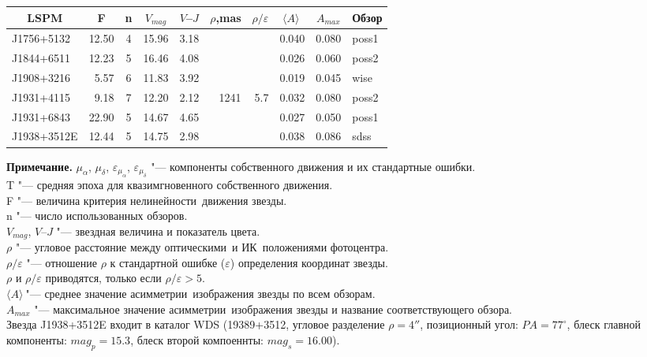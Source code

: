 \begin{table}[htbp]
\begin{tabularx}{\textwidth}{l|r|c|r|r|r|r|r|r|l}
\multicolumn{1}{c|}{LSPM}&\multicolumn{1}{c|}{F}&\multicolumn{1}{c|}{n}&\multicolumn{1}{c|}{$V_{mag}$}&\multicolumn{1}{c|}{{\small$V$--$J$}}&\multicolumn{1}{c|}{$\rho$,mas}&\multicolumn{1}{c|}{$\rho/\varepsilon$}&\multicolumn{1}{c|}{$\langle A\rangle\ $}&\multicolumn{1}{c|}{$A_{max}$}& \multicolumn{1}{c}{Обзор}\\ \hline
        J1756+5132 & 12.50& 4 & 15.96& 3.18 &     &     & 0.040& 0.080& poss1\\
J1844+6511 & 12.23& 5 & 16.46& 4.08 &     &     & 0.026& 0.060& poss2\\
J1908+3216 &  5.57& 6 & 11.83& 3.92 &     &     & 0.019& 0.045& wise\\
J1931+4115 &  9.18& 7 & 12.20& 2.12 & 1241&  5.7& 0.032& 0.080& poss2\\
J1931+6843 & 22.90& 5 & 14.67& 4.65 &     &     & 0.027& 0.050& poss1\\
J1938+3512E& 12.44& 5 & 14.75& 2.98 &     &     & 0.038& 0.086& sdss\\
\hline
\end{tabularx}
\begin{flushleft}
\footnotesize
\textbf{Примечание.} $\mu_{\alpha}$, $\mu_{\delta}$, $\varepsilon_{\mu_{\alpha}}$, $\varepsilon_{\mu_{\delta}}$ "--- компоненты собственного движения и их стандартные ошибки.\\T "--- средняя эпоха для квазимгновенного собственного движения.\\F "--- величина критерия \glqq нелинейности\grqq\ движения звезды.\\ n "--- число использованных обзоров.\\ $V_{mag}$, {\small$V$--$J$} "--- звездная величина и показатель цвета. \\ $\rho$ "--- угловое расстояние между \glqq оптическими\grqq\ и \glqq ИК\grqq\ положениями фотоцентра. \\ $\rho/\varepsilon$ "--- отношение $\rho$ к стандартной ошибке ($\varepsilon$) определения координат звезды. \\ $\rho$ и $\rho/\varepsilon$ приводятся, только если $\rho/\varepsilon>5$. \\ $\langle A\rangle\ $"--- среднее значение \glqq асимметрии\grqq\ изображения звезды по всем обзорам. \\ $A_{max}$ "--- максимальное значение \glqq асимметрии\grqq\ изображения звезды и название соответствующего обзора. \\ Звезда J1938+3512E входит в каталог WDS (19389+3512, угловое разделение $\rho=4''$, позиционный угол: $PA=77^{\circ}$, блеск главной компоненты: $mag_p = 15.3$, блеск второй компоеннты: $mag_s=16.00$).
\end{flushleft}
\end{table}




